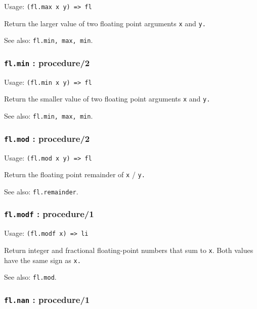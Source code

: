 \documentclass[
]{article}
\newcommand{\passthrough}[1]{#1}
\begin{document}
Usage: \passthrough{\lstinline!(fl.max x y) => fl!}

Return the larger value of two floating point arguments
\passthrough{\lstinline!x!} and \passthrough{\lstinline!y.!}

See also: \passthrough{\lstinline!fl.min, max, min!}.

\hypertarget{fl.min-procedure2}{%
\subsubsection{\texorpdfstring{\texttt{fl.min} :
procedure/2}{fl.min : procedure/2}}\label{fl.min-procedure2}}

Usage: \passthrough{\lstinline!(fl.min x y) => fl!}

Return the smaller value of two floating point arguments
\passthrough{\lstinline!x!} and \passthrough{\lstinline!y.!}

See also: \passthrough{\lstinline!fl.min, max, min!}.

\hypertarget{fl.mod-procedure2}{%
\subsubsection{\texorpdfstring{\texttt{fl.mod} :
procedure/2}{fl.mod : procedure/2}}\label{fl.mod-procedure2}}

Usage: \passthrough{\lstinline!(fl.mod x y) => fl!}

Return the floating point remainder of \passthrough{\lstinline!x!} /
\passthrough{\lstinline!y.!}

See also: \passthrough{\lstinline!fl.remainder!}.

\hypertarget{fl.modf-procedure1}{%
\subsubsection{\texorpdfstring{\texttt{fl.modf} :
procedure/1}{fl.modf : procedure/1}}\label{fl.modf-procedure1}}

Usage: \passthrough{\lstinline!(fl.modf x) => li!}

Return integer and fractional floating-point numbers that sum to
\passthrough{\lstinline!x!}. Both values have the same sign as
\passthrough{\lstinline!x.!}

See also: \passthrough{\lstinline!fl.mod!}.

\hypertarget{fl.nan-procedure1}{%
\subsubsection{\texorpdfstring{\texttt{fl.nan} :
procedure/1}{fl.nan : procedure/1}}\label{fl.nan-procedure1}}
\end{document}
